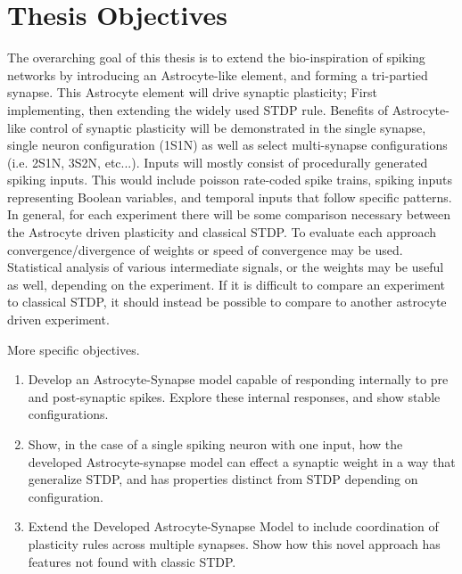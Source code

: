 \section{Thesis Objectives}

The overarching goal of this thesis is to extend the bio-inspiration of
spiking networks by introducing an Astrocyte-like element, and forming a
tri-partied synapse. This Astrocyte element will drive synaptic plasticity;
First implementing, then extending the widely used STDP rule. Benefits of
Astrocyte-like control of synaptic plasticity will be demonstrated in the
single synapse, single neuron configuration (1S1N) as well as select
multi-synapse configurations (i.e. 2S1N, 3S2N, etc...). Inputs will mostly
consist of procedurally generated spiking inputs. This would include poisson
rate-coded spike trains, spiking inputs representing Boolean variables, and
temporal inputs that follow specific patterns. In general, for each
experiment there will be some comparison necessary between the Astrocyte
driven plasticity and classical STDP. To evaluate each approach
convergence/divergence of weights or speed of convergence may be
used. Statistical analysis of various intermediate signals, or the weights
may be useful as well, depending on the experiment. If it is difficult to
compare an experiment to classical STDP, it should instead be possible to
compare to another astrocyte driven experiment.

More specific objectives.
\begin{enumerate}
  \item Develop an Astrocyte-Synapse model capable of responding internally to pre and
    post-synaptic spikes. Explore these internal responses, and show stable configurations.

  \item Show, in the case of a single spiking neuron with one input, how
    the developed Astrocyte-synapse model can effect a synaptic weight in a way
    that generalize STDP, and has properties distinct from STDP depending on
    configuration.

  \item Extend the Developed Astrocyte-Synapse Model to include coordination of
    plasticity rules across multiple synapses. Show how this novel approach has
    features not found with classic STDP.

\end{enumerate}
